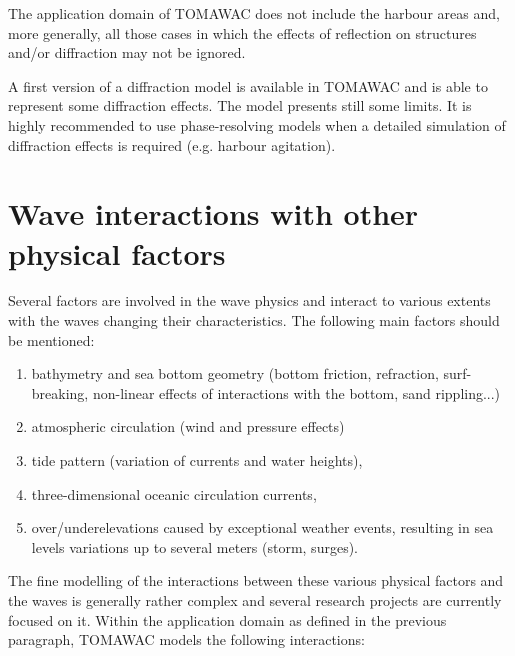  The application domain of TOMAWAC does not include the harbour areas and, more generally, all those cases in which the effects of reflection on structures and/or diffraction may not be ignored.

 A first version of a diffraction model is available in TOMAWAC and is able to represent some diffraction effects. The model presents still some limits. It is highly recommended to use phase-resolving models when a detailed simulation of diffraction effects is required (e.g. harbour agitation).


\section{ Wave interactions with other physical factors}

 Several factors are involved in the wave physics and interact to various extents with the waves changing their characteristics. The following main factors should be mentioned:

 \begin{enumerate}
\item bathymetry and sea bottom geometry (bottom friction, refraction, surf-breaking, non-linear effects of interactions with the bottom, sand rippling...)

 \item atmospheric circulation (wind and pressure effects)

 \item tide pattern (variation of currents and water heights),

 \item three-dimensional oceanic circulation currents,

 \item over/underelevations caused by exceptional weather events, resulting in sea levels variations up to several meters (storm, surges).
\end{enumerate}

 The fine modelling of the interactions between these various physical factors and the waves is generally rather complex and several research projects are currently focused on it. Within the application domain as defined in the previous paragraph, TOMAWAC models the following interactions:

